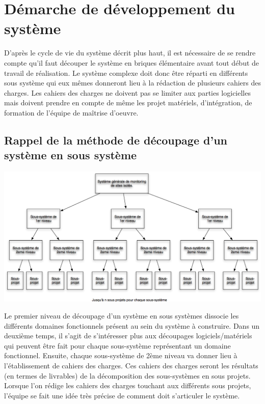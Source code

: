 \section{Démarche de développement du système}
D'après le cycle de vie du système décrit plus haut, il est nécessaire de se rendre compte qu'il faut découper le système en briques élémentaire avant tout début de travail de réalisation. Le système complexe doit donc être réparti en différents sous système qui eux mêmes donneront lieu à la rédaction de plusieurs cahiers des charges. Les cahiers des charges ne doivent pas se limiter aux parties logicielles mais doivent prendre en compte de même les projet matériels, d'intégration, de formation de l'équipe de maîtrise d'oeuvre.

\subsection{Rappel de la méthode de découpage d'un système en sous système}

\begin {center}
\includegraphics[width=\textwidth]{png/decoupageType.png}
\end {center}

Le premier niveau de découpage d'un système en sous systèmes dissocie les différents domaines fonctionnels présent au sein du système à construire. Dans un deuxième temps, il s'agit de s'intéresser plus aux découpages logiciels/matériels qui peuvent être fait pour chaque sous-système représentant un domaine fonctionnel.
Ensuite, chaque sous-système de 2ème niveau va donner lieu à l'établissement de cahiers des charges. Ces cahiers des charges seront les résultats (en termes de livrables) de la décomposition des sous-systèmes en sous projets. Lorsque l'on rédige les cahiers des charges touchant aux différents sous projets, l'équipe se fait une idée très précise de comment doit s'articuler le système.

